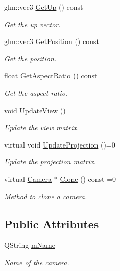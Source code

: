\begin{DoxyCompactItemize}
glm\+::vec3 \hyperlink{class_camera_a1b56c423208d38cfeb1c2a22c70e731f}{Get\+Up} () const 
\begin{DoxyCompactList}\small\item\em Get the up vector. \end{DoxyCompactList}\item 
glm\+::vec3 \hyperlink{class_camera_a079285d595d22981062dcb181bc17ae9}{Get\+Position} () const 
\begin{DoxyCompactList}\small\item\em Get the position. \end{DoxyCompactList}\item 
float \hyperlink{class_camera_ae8450c209a1fb0c3353afebc1c685fe2}{Get\+Aspect\+Ratio} () const 
\begin{DoxyCompactList}\small\item\em Get the aspect ratio. \end{DoxyCompactList}\item 
void \hyperlink{class_camera_a0b31de4a23f304be6e27d53706d326c5}{Update\+View} ()
\begin{DoxyCompactList}\small\item\em Update the view matrix. \end{DoxyCompactList}\item 
virtual void \hyperlink{class_camera_a199f2379e1a1603da6cca9fe0162626d}{Update\+Projection} ()=0
\begin{DoxyCompactList}\small\item\em Update the projection matrix. \end{DoxyCompactList}\item 
virtual \hyperlink{class_camera}{Camera} $\ast$ \hyperlink{class_camera_a81df82c60ae1a1d32090433ebdd30628}{Clone} () const =0
\begin{DoxyCompactList}\small\item\em Method to clone a camera. \end{DoxyCompactList}\end{DoxyCompactItemize}
\subsection*{Public Attributes}
\begin{DoxyCompactItemize}
\item 
Q\+String \hyperlink{class_camera_a236dc6770d98461537d95794178be50f}{m\+Name}
\begin{DoxyCompactList}\small\item\em Name of the camera. \end{DoxyCompactList}\end{DoxyCompactItemize}
